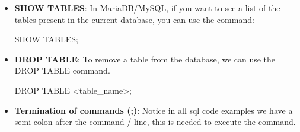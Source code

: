 \documentclass{report}
\begin{document}
\begin{itemize}
    \item \textbf{SHOW TABLES}: In MariaDB/MySQL, if you want to see a list of the tables present in the current database, you can use the command:
        \bigbreak \noindent 
        \begin{sqlcode}
            SHOW TABLES;
        \end{sqlcode}
    \item \textbf{DROP TABLE}: To remove a table from the database, we can use the DROP TABLE command.
        \bigbreak \noindent 
        \begin{sqlcode}
        DROP TABLE <table_name>;
        \end{sqlcode}
    \item \textbf{Termination of commands (;)}: Notice in all sql code examples we have a semi colon after the command / line, this is needed to execute the command.








    \end{itemize}

    \pagebreak 
\end{document}
